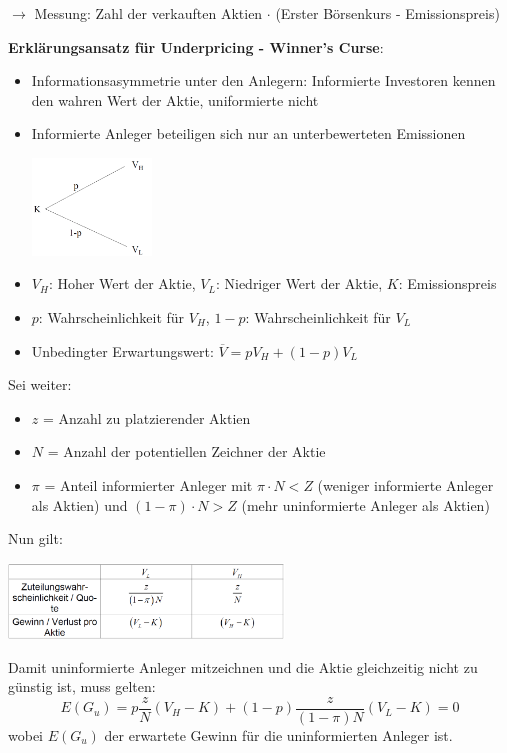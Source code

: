 $\rightarrow$ Messung: Zahl der verkauften Aktien $\cdot$ (Erster Börsenkurs - Emissionspreis)

\textbf{Erklärungsansatz für Underpricing - Winner's Curse}:
\begin{itemize}
	\item Informationsasymmetrie unter den Anlegern: Informierte Investoren kennen den wahren Wert der Aktie, uniformierte nicht
	\item Informierte Anleger beteiligen sich nur an unterbewerteten Emissionen
	\begin{center}
		\includegraphics[width=0.25\textwidth]{images/wc.png}
	\end{center}
	\item $V_H$: Hoher Wert der Aktie, $V_L$: Niedriger Wert der Aktie, $K$: Emissionspreis
	\item $p$: Wahrscheinlichkeit für $V_H$, $1-p$: Wahrscheinlichkeit für $V_L$
	\item Unbedingter Erwartungswert: $\overline{V}=pV_H+(1-p)V_L$
\end{itemize}

Sei weiter:
\begin{itemize}
	\item $z$ = Anzahl zu platzierender Aktien
	\item $N$ = Anzahl der potentiellen Zeichner der Aktie
	\item $\pi$ = Anteil informierter Anleger mit $\pi\cdot N<Z$ (weniger informierte Anleger als Aktien) und $(1-\pi)\cdot N>Z$ (mehr uninformierte Anleger als Aktien)
\end{itemize}

Nun gilt:
\begin{center}
	\includegraphics[width=0.55\textwidth]{images/wc-2.png}
\end{center} 

Damit uninformierte Anleger mitzeichnen und die Aktie gleichzeitig nicht zu günstig ist, muss gelten:
$$E(G_u)=p\frac{z}{N}(V_H-K)+(1-p)\frac{z}{(1-\pi)N}(V_L-K)=0$$
wobei $E(G_u)$ der erwartete Gewinn für die uninformierten Anleger ist.

